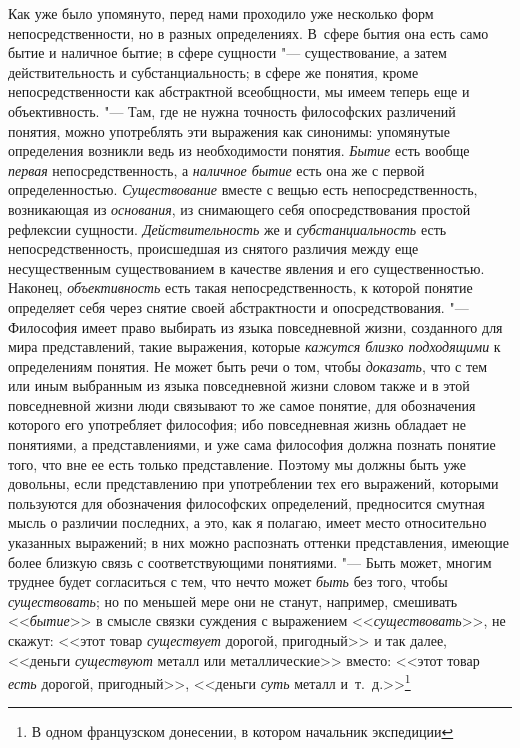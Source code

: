 {{Как уже было упомянуто, перед нами проходило уже несколько
форм непосредственности, но в разных определениях. В~сфере бытия она есть
само бытие и наличное бытие; в сфере сущности
"--- существование, а затем действительность и
субстанциальность; в сфере же понятия, кроме непосредственности как
абстрактной всеобщности, мы имеем теперь еще и объективность. "---
Там, где не нужна точность философских различений понятия,
можно употреблять эти выражения как синонимы: упомянутые определения
возникли ведь из необходимости понятия. {\em Бытие} есть вообще
{\em первая} непосредственность, а {\em наличное бытие} есть
она же с первой определенностью. {\em Существование}
вместе с вещью есть непосредственность, возникающая из {\em основания}, из
снимающего себя опосредствования простой рефлексии сущности.
{\em Действительность} же и {\em субстанциальность}
есть непосредственность, происшедшая из снятого различия
между еще несущественным существованием в качестве явления и его
существенностью. Наконец, {\em объективность} есть
такая непосредственность, к которой понятие определяет себя через снятие
своей абстрактности и опосредствования. "--- Философия имеет
право выбирать из языка повседневной жизни, созданного для мира
представлений, такие выражения, которые {\em кажутся близко подходящими}
к определениям понятия. Не может быть речи о том, чтобы {\em доказать}, что
с тем или иным выбранным из языка повседневной жизни словом также и в этой
повседневной жизни люди связывают то же самое понятие, для обозначения
которого его употребляет философия; ибо повседневная жизнь
обладает не понятиями, а представлениями, и уже сама философия должна
познать понятие того, что вне ее есть только представление. Поэтому мы
должны быть уже довольны, если представлению при употреблении тех его
выражений, которыми пользуются для обозначения философских определений,
предносится смутная мысль о различии последних, а это, как я полагаю, имеет
место относительно указанных выражений; в них можно распознать оттенки
представления, имеющие более близкую связь с соответствующими понятиями. "---
Быть может, многим труднее будет согласиться с тем, что нечто
может {\em быть} без того, чтобы {\em существовать};
но по меньшей мере они не станут, например, смешивать <<{\em бытие}>> в смысле
связки суждения с выражением <<{\em существовать}>>, не
скажут: <<этот товар {\em существует}
дорогой, пригодный>> и так далее, <<деньги {\em существуют} металл
или металлические>> вместо: <<этот товар {\em есть} дорогой,
пригодный>>, <<деньги {\em суть} металл и~т.~д.>>\footnote{
В одном французском донесении, в котором начальник экспедиции
}}}
